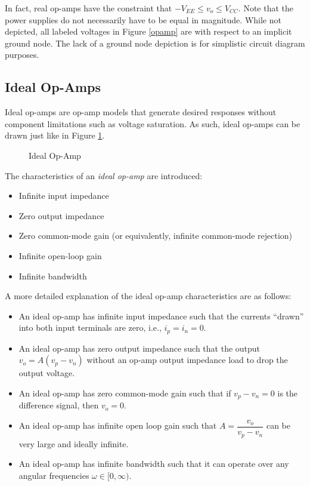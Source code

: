 \documentclass{report}
\begin{document}
In fact, real op-amps have the constraint that $-V_{EE} \leq v_o \leq V_{CC}$. Note that the power supplies do not necessarily have to be equal in magnitude. 
While not depicted, all labeled voltages in Figure \ref{opamp} are with respect to an implicit ground node. The lack of a ground node depiction is for 
simplistic circuit diagram purposes.

\subsection{Ideal Op-Amps}
Ideal op-amps are op-amp models that generate desired responses without component limitations such as voltage saturation. As such, ideal op-amps can be drawn just like in Figure \ref{ideal_opamp}.
\begin{figure}[!hbt]
    \centering
    \caption{Ideal Op-Amp}
    \label{ideal_opamp}
\end{figure}
\begin{tcolorbox}[width=\textwidth,colback={white}, sharp corners]
The characteristics of an \emph{ideal op-amp} are introduced:
\begin{itemize}
    \item Infinite input impedance 
    \item Zero output impedance
    \item Zero common-mode gain (or equivalently, infinite common-mode rejection)
    \item Infinite open-loop gain
    \item Infinite bandwidth
\end{itemize}
\end{tcolorbox}
A more detailed explanation of the ideal op-amp characteristics are as follows:
\begin{itemize}
    \item An ideal op-amp has infinite input impedance such that the currents ``drawn'' into both input terminals are zero, i.e., $i_p=i_n=0$.
    \item An ideal op-amp has zero output impedance such that the output $v_o=A(v_p-v_n)$ without an op-amp output impedance load to drop the output voltage.
    \item An ideal op-amp has zero common-mode gain such that if $v_p-v_n=0$ is the difference signal, then $v_o=0$.
    \item An ideal op-amp has infinite open loop gain such that $A = \dfrac{v_o}{v_p - v_n}$ can be very large and ideally infinite.
    \item An ideal op-amp has infinite bandwidth such that it can operate over any angular frequencies $\omega\in[0,\infty)$.
\end{itemize}
\end{document}

